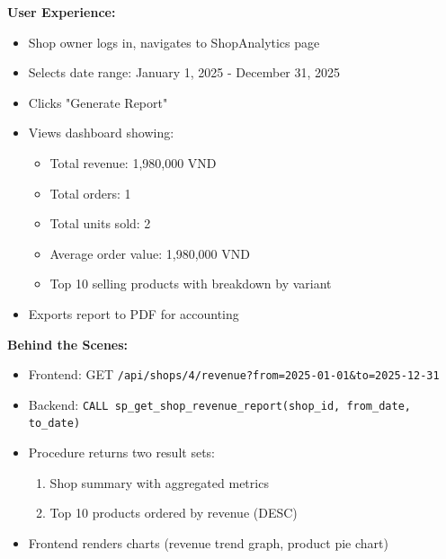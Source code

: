 \textbf{User Experience:}
\begin{itemize}
    \item Shop owner logs in, navigates to ShopAnalytics page
    \item Selects date range: January 1, 2025 - December 31, 2025
    \item Clicks "Generate Report"
    \item Views dashboard showing:
    \begin{itemize}
        \item Total revenue: 1,980,000 VND
        \item Total orders: 1
        \item Total units sold: 2
        \item Average order value: 1,980,000 VND
        \item Top 10 selling products with breakdown by variant
    \end{itemize}
    \item Exports report to PDF for accounting
\end{itemize}

\textbf{Behind the Scenes:}
\begin{itemize}
    \item Frontend: GET \texttt{/api/shops/4/revenue?from=2025-01-01\&to=2025-12-31}
    \item Backend: \texttt{CALL sp\_get\_shop\_revenue\_report(shop\_id, from\_date, to\_date)}
    \item Procedure returns two result sets:
    \begin{enumerate}
        \item Shop summary with aggregated metrics
        \item Top 10 products ordered by revenue (DESC)
    \end{enumerate}
    \item Frontend renders charts (revenue trend graph, product pie chart)
\end{itemize}